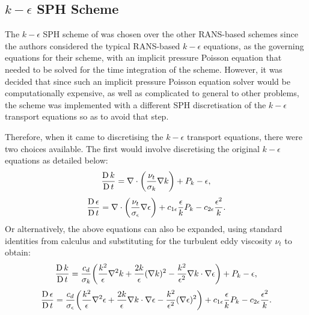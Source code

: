 \subsection[k-epsilon SPH Scheme]{$k-\epsilon$ SPH Scheme}
The $k-\epsilon$ SPH scheme of \cite{Shao2006} was chosen over the other RANS-based schemes since the authors considered the typical RANS-based $k-\epsilon$ equations, as the governing equations for their scheme, with an implicit pressure Poisson equation that needed to be solved for the time integration of the scheme.
However, it was decided that since such an implicit pressure Poisson equation solver would be computationally expensive, as well as complicated to general to other problems, the scheme was implemented with a different SPH discretisation of the $k-\epsilon$ transport equations so as to avoid that step.

Therefore, when it came to discretising the $k-\epsilon$ transport equations, there were two choices available.
The first would involve discretising the original $k-\epsilon$ equations as detailed below:
\begin{equation}
  \frac{\operatorname{D} k}{\operatorname{D} t} = \nabla \cdot \bigg( \frac{\nu_t}{\sigma_k} \nabla k \bigg) + P_k - \epsilon,
  \label{eq:Shao2006-k-transport-eq-res-chap}
\end{equation}
\begin{equation}
  \frac{\operatorname{D} \epsilon}{\operatorname{D} t} = \nabla \cdot \bigg( \frac{\nu_t}{\sigma_{\epsilon}} \nabla \epsilon \bigg) + c_{1\epsilon} \frac{\epsilon}{k} P_k - c_{2\epsilon} \frac{\epsilon^2}{k}.
  \label{eq:Shao2006-eps-transport-eq-res-chap}
\end{equation}
Or alternatively, the above equations can also be expanded, using standard identities from calculus and substituting for the turbulent eddy viscosity $\nu_t$ to obtain:
\begin{equation}
  \frac{\operatorname{D} k}{\operatorname{D} t} = \frac{c_d}{\sigma_k} \bigg( \frac{k^2}{\epsilon} \nabla^2 k + \frac{2k}{\epsilon} (\nabla k)^2 - \frac{k^2}{\epsilon^2} \nabla k \cdot \nabla \epsilon \bigg) + P_k - \epsilon,
  \label{eq:Shao2006-k-transport-eq-exp-res-chap}
\end{equation}
\begin{equation}
  \frac{\operatorname{D} \epsilon}{\operatorname{D} t} = \frac{c_d}{\sigma_\epsilon} \bigg( \frac{k^2}{\epsilon} \nabla^2 \epsilon + \frac{2k}{\epsilon} \nabla k \cdot \nabla \epsilon - \frac{k^2}{\epsilon^2} (\nabla \epsilon)^2 \bigg) + c_{1\epsilon} \frac{\epsilon}{k} P_k - c_{2\epsilon} \frac{\epsilon^2}{k}.
  \label{eq:Shao2006-eps-transport-eq-exp-res-chap}
\end{equation}


